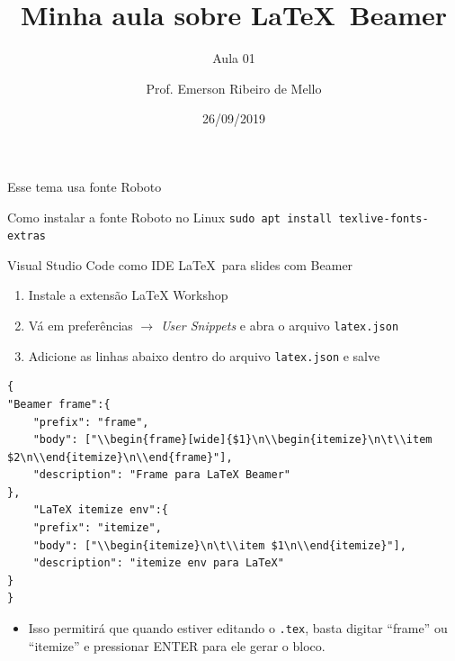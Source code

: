 \documentclass{beamer}
\title{Minha aula sobre \LaTeX~Beamer}
\subtitle{Aula 01}
\author{Prof. Emerson Ribeiro de Mello}
\institute{%
\href{mello@ifsc.edu.br}{mello@ifsc.edu.br}%
}%
\date{26/09/2019}
\begin{document}
\begin{frame}[plain]
	\titlepage
\end{frame}




\jsonp
\lstset{numbers=none}

\begin{frame}[wide]{Esse tema usa fonte Roboto}
\begin{alertblock}{Como instalar a fonte Roboto no Linux}
     \texttt{sudo apt install texlive-fonts-extras}
\end{alertblock}
\end{frame}

\begin{frame}{Visual Studio Code como IDE \LaTeX~para slides com Beamer}
\begin{enumerate}
    \item Instale a extensão LaTeX Workshop
    \item Vá em preferências \(\rightarrow\) \textit{User Snippets} e abra o arquivo \texttt{latex.json}
    \item Adicione as linhas abaixo dentro do arquivo \texttt{latex.json} e salve
\end{enumerate}

\begin{lstlisting}
{
"Beamer frame":{
    "prefix": "frame",
    "body": ["\\begin{frame}[wide]{$1}\n\\begin{itemize}\n\t\\item $2\n\\end{itemize}\n\\end{frame}"],
    "description": "Frame para LaTeX Beamer"
},
    "LaTeX itemize env":{
    "prefix": "itemize",
    "body": ["\\begin{itemize}\n\t\\item $1\n\\end{itemize}"],
    "description": "itemize env para LaTeX"
}
}
\end{lstlisting}
\begin{itemize}
    \item Isso permitirá que quando estiver editando o \texttt{.tex},  basta digitar ``frame'' ou ``itemize'' e pressionar ENTER para ele gerar o bloco.
\end{itemize}
\end{frame}
\end{document}
